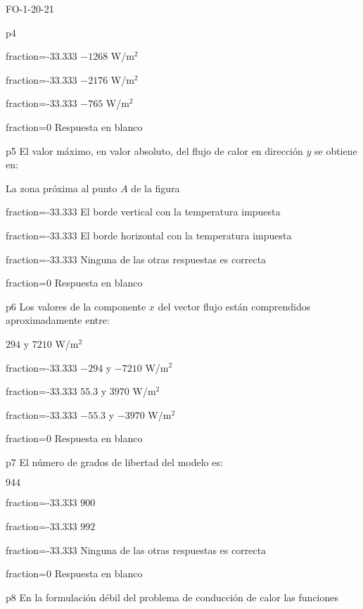 \documentclass[a4paper]{article}
\begin{document}
\begin{quiz}{FO-1-20-21}
\begin{multi}{p4}
\item[fraction=-33.333] $-1268$ W/m$^2$
\item[fraction=-33.333] $-2176$ W/m$^2$
\item[fraction=-33.333] $-765$ W/m$^2$
\item[fraction=0] Respuesta en blanco
\end{multi}
\begin{multi}{p5}
El valor m\'aximo, en valor absoluto, del flujo de calor en direcci\'on $y$ se obtiene en:
\item* La zona pr\'oxima al punto $A$ de la figura
\item[fraction=-33.333] El borde vertical con la temperatura impuesta
\item[fraction=-33.333] El borde horizontal con la temperatura impuesta
\item[fraction=-33.333] Ninguna de las otras respuestas es correcta
\item[fraction=0] Respuesta en blanco
\end{multi}
\begin{multi}{p6}
Los valores de la componente $x$ del vector flujo est\'an
comprendidos aproximadamente entre:
\item* $294$ y $7210$ W/m$^2$
\item[fraction=-33.333] $-294$ y $-7210$ W/m$^2$
\item[fraction=-33.333] $55.3$ y $3970$ W/m$^2$
\item[fraction=-33.333] $-55.3$ y $-3970$ W/m$^2$
\item[fraction=0] Respuesta en blanco
\end{multi}
\begin{multi}{p7}
El n\'umero de grados de libertad del modelo es:
\item* $944$
\item[fraction=-33.333] $900$
\item[fraction=-33.333] $992$
\item[fraction=-33.333] Ninguna de las otras respuestas es correcta
\item[fraction=0] Respuesta en blanco
\end{multi}
\begin{multi}{p8}
	En la formulaci\'on d\'ebil del problema de conducci\'on de calor las funciones

\end{multi}
\end{quiz}
\end{document}
